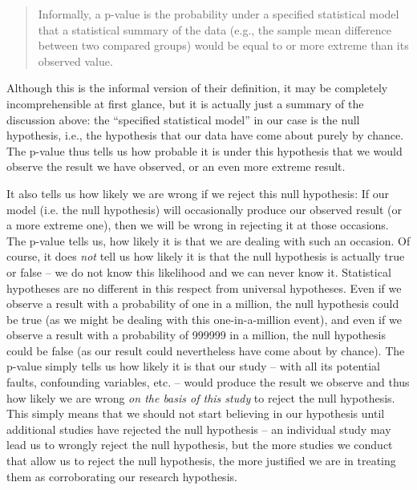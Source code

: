 \begin{quote}
Informally, a p\hyp{}value  is the probability under a specified statistical model that a statistical summary of the data (e.g., the sample mean difference between two compared groups) would be equal to or more extreme than its observed value. \citep[131]{wasserstein_asas_2016}
\end{quote}

Although this is the informal version of their definition, it may be completely incomprehensible at first glance, but it is actually just a summary of the discussion above: the ``specified statistical model'' in our case is the null hypothesis,  i.e., the hypothesis that our data have come about purely by chance.  The p\hyp{}value  thus tells us how probable it is under this hypothesis that we would observe the result we have observed, or an even more extreme result.

It also tells us how likely we are wrong if we reject this null hypothesis:  If our model (i.e. the null hypothesis) will occasionally produce our observed result (or a more extreme one), then we will be wrong in rejecting it at those occasions. The p\hyp{}value  tells us, how likely it is that we are dealing with such an occasion. Of course, it does \textit{not} tell us how likely it is that the null hypothesis is actually true or false -- we do not know this likelihood and we can never know it. Statistical hypotheses are no different in this respect from universal hypotheses. Even if we observe a result with a probability  of one in a million, the null hypothesis  could be true (as we might be dealing with this one\hyp{}in\hyp{}a\hyp{}million event),  and even if we observe a result with a probability of \num{999999} in a million, the null hypothesis could be false (as our result could nevertheless have come about by chance).  The p\hyp{}value  simply tells us how likely it is that our study -- with all its potential faults, confounding variables, etc. -- would produce the result we observe and thus how likely we are wrong \textit{on the basis of this study} to reject the null hypothesis.  This simply means that we should not start believing in our hypothesis until additional studies have rejected the null hypothesis -- an individual study may lead us to wrongly reject the null hypothesis, but the more studies we conduct that allow us to reject the null hypothesis, the more justified we are in treating them as corroborating  our research hypothesis.

